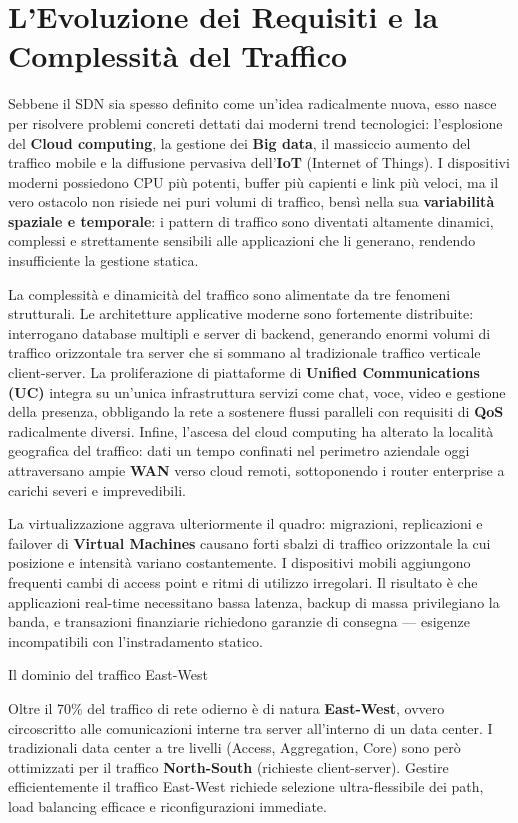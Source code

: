 \documentclass[
  italian,
  openany]{book}
\begin{document}
\section{L'Evoluzione dei Requisiti e la Complessità del
Traffico}\label{levoluzione-dei-requisiti-e-la-complessituxe0-del-traffico}

Sebbene il SDN sia spesso definito come un'idea radicalmente nuova, esso
nasce per risolvere problemi concreti dettati dai moderni trend
tecnologici: l'esplosione del \textbf{Cloud computing}, la gestione dei
\textbf{Big data}, il massiccio aumento del traffico mobile e la
diffusione pervasiva dell'\textbf{IoT} (Internet of Things). I
dispositivi moderni possiedono CPU più potenti, buffer più capienti e
link più veloci, ma il vero ostacolo non risiede nei puri volumi di
traffico, bensì nella sua \textbf{variabilità spaziale e temporale}: i
pattern di traffico sono diventati altamente dinamici, complessi e
strettamente sensibili alle applicazioni che li generano, rendendo
insufficiente la gestione statica.

La complessità e dinamicità del traffico sono alimentate da tre fenomeni
strutturali. Le architetture applicative moderne sono fortemente
distribuite: interrogano database multipli e server di backend,
generando enormi volumi di traffico orizzontale tra server che si
sommano al tradizionale traffico verticale client-server. La
proliferazione di piattaforme di \textbf{Unified Communications (UC)}
integra su un'unica infrastruttura servizi come chat, voce, video e
gestione della presenza, obbligando la rete a sostenere flussi paralleli
con requisiti di \textbf{QoS} radicalmente diversi. Infine, l'ascesa del
cloud computing ha alterato la località geografica del traffico: dati un
tempo confinati nel perimetro aziendale oggi attraversano ampie
\textbf{WAN} verso cloud remoti, sottoponendo i router enterprise a
carichi severi e imprevedibili.

La virtualizzazione aggrava ulteriormente il quadro: migrazioni,
replicazioni e failover di \textbf{Virtual Machines} causano forti
sbalzi di traffico orizzontale la cui posizione e intensità variano
costantemente. I dispositivi mobili aggiungono frequenti cambi di access
point e ritmi di utilizzo irregolari. Il risultato è che applicazioni
real-time necessitano bassa latenza, backup di massa privilegiano la
banda, e transazioni finanziarie richiedono garanzie di consegna ---
esigenze incompatibili con l'instradamento statico.

\begin{calloutnote}{Il dominio del traffico East-West}

Oltre il 70\% del traffico di rete odierno è di natura
\textbf{East-West}, ovvero circoscritto alle comunicazioni interne tra
server all'interno di un data center. I tradizionali data center a tre
livelli (Access, Aggregation, Core) sono però ottimizzati per il
traffico \textbf{North-South} (richieste client-server). Gestire
efficientemente il traffico East-West richiede selezione
ultra-flessibile dei path, load balancing efficace e riconfigurazioni
immediate.

\end{calloutnote}
\end{document}
